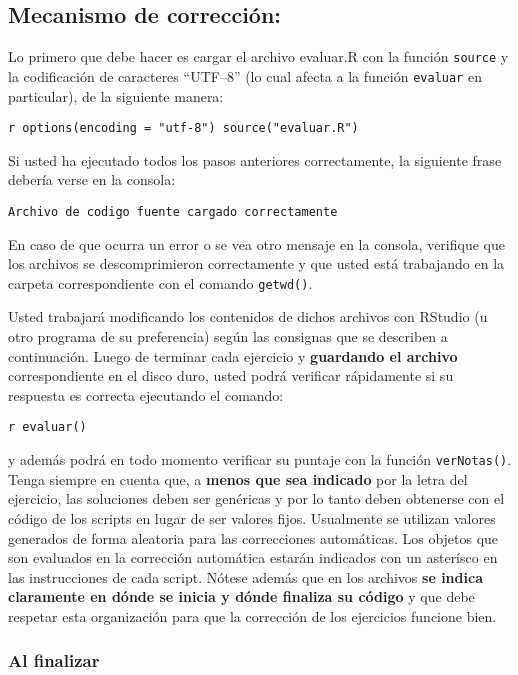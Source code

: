 \documentclass{article}
\begin{document}
\subsection{Mecanismo de corrección:}

Lo primero que debe hacer es cargar el archivo evaluar.R con la función
\verb!source! y la codificación de caracteres ``UTF--8'' (lo cual afecta
a la función \verb!evaluar! en particular), de la siguiente manera:

\verb!r options(encoding = "utf-8") source("evaluar.R")!

Si usted ha ejecutado todos los pasos anteriores correctamente, la
siguiente frase debería verse en la consola:

\begin{verbatim}
Archivo de codigo fuente cargado correctamente
\end{verbatim}
En caso de que ocurra un error o se vea otro mensaje en la consola,
verifique que los archivos se descomprimieron correctamente y que usted
está trabajando en la carpeta correspondiente con el comando
\verb!getwd()!.

Usted trabajará modificando los contenidos de dichos archivos con
RStudio (u otro programa de su preferencia) según las consignas que se
describen a continuación. Luego de terminar cada ejercicio y
\textbf{guardando el archivo} correspondiente en el disco duro, usted
podrá verificar rápidamente si su respuesta es correcta ejecutando el
comando:

\verb!r evaluar()!

y además podrá en todo momento verificar su puntaje con la función
\verb!verNotas()!. Tenga siempre en cuenta que, a \textbf{menos que sea
indicado} por la letra del ejercicio, las soluciones deben ser genéricas
y por lo tanto deben obtenerse con el código de los scripts en lugar de
ser valores fijos. Usualmente se utilizan valores generados de forma
aleatoria para las correcciones automáticas. Los objetos que son
evaluados en la corrección automática estarán indicados con un asterísco
en las instrucciones de cada script. Nótese además que en los archivos
\textbf{se indica claramente en dónde se inicia y dónde finaliza su
código} y que debe respetar esta organización para que la corrección de
los ejercicios funcione bien.

\subsubsection{Al finalizar}
\end{document}
